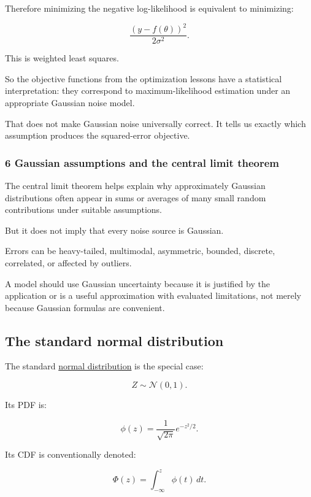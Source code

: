 Therefore minimizing the negative log-likelihood is equivalent to minimizing:

\[
 \boxed{ \frac{(y-f(\theta))^2}{2\sigma^2} }.
\]

This is weighted least squares.

So the objective functions from the optimization lessons have a statistical interpretation: they correspond to maximum-likelihood estimation under an appropriate Gaussian noise model.

That does not make Gaussian noise universally correct. It tells us exactly which assumption produces the squared-error objective.

\subsubsection{6 Gaussian assumptions and the central limit theorem}\label{02-foundations-ii-ch023-gaussian-assumptions-and-the-central-limit-theorem}

The central limit theorem helps explain why approximately Gaussian distributions often appear in sums or averages of many small random contributions under suitable assumptions.

But it does not imply that every noise source is Gaussian.

Errors can be heavy-tailed, multimodal, asymmetric, bounded, discrete, correlated, or affected by outliers.

A model should use Gaussian uncertainty because it is justified by the application or is a useful approximation with evaluated limitations, not merely because Gaussian formulas are convenient.

\subsection{The standard normal distribution}\label{02-foundations-ii-ch023-the-standard-normal-distribution}

The standard \hyperref[02-foundations-ii-ch023-discrete-and-continuous-distribution-families]{normal distribution} is the special case:

\[
 \boxed{Z\sim\mathcal N(0,1)}.
\]

Its PDF is:

\[
 \boxed{ \phi(z)= \frac1{\sqrt{2\pi}}e^{-z^2/2} }.
\]

Its CDF is conventionally denoted:

\[
 \boxed{ \Phi(z)= \int_{-\infty}^{z}\phi(t)\,dt }.
\]

